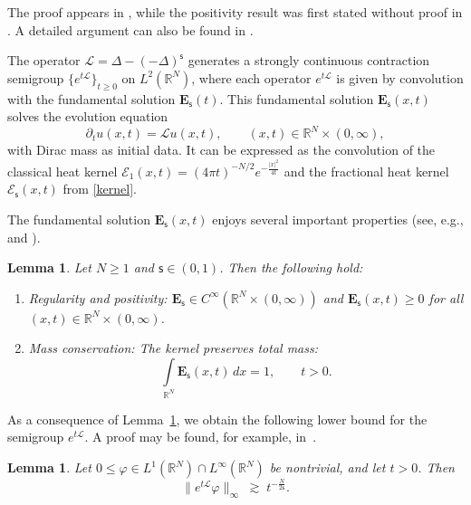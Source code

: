 \documentclass[12pt,reqno]{amsart}
\theoremstyle{plain}
\newtheorem{lem}[thm]{Lemma}
\theoremstyle{definition}
\theoremstyle{remark}
\numberwithin{equation}{section}
\newcommand{\R}{\mathbb R}
\newcommand{\sL}{\mathscr{L}}
\newcommand{\ts}{\mathsf{s}}
\begin{document}
The proof appears in \cite[p.~395]{Alonso2021}, while the positivity result was first stated without proof in \cite[p.~263]{BG1960}. A detailed argument can also be found in \cite[Theorem~2.1]{BG1960}.

The operator $\mathscr{L}=\Delta-(-\Delta)^{\ts}$ generates a strongly continuous contraction semigroup $\{e^{t\mathscr{L}}\}_{t\geq 0}$ on $L^2(\R^N)$, where each operator $e^{t\mathscr{L}}$ is given by convolution with the fundamental solution $\mathbf{E}_{\ts}(t)$. This fundamental solution $\mathbf{E}_{\ts}(x,t)$ solves the evolution equation
\begin{equation}\label{eq-1-1-1}
    \partial_t u(x,t) = \mathscr{L} u(x,t),
    \qquad (x,t)\in \R^N\times (0,\infty),
\end{equation}
with Dirac mass as initial data. It can be expressed as the convolution of the classical heat kernel $\mathscr{E}_{1}(x,t) = (4\pi t)^{-N/2} e^{-\frac{|x|^2}{4t}}$ and the fractional heat kernel $\mathscr{E}_{\ts}(x,t)$ from \eqref{kernel}.  

The fundamental solution $\mathbf{E}_{\ts}(x,t)$ enjoys several important properties (see, e.g., \cite{Kirane2025} and \cite{biagi2024}).

\begin{lem}\label{E-s}
Let $N\ge 1$ and $\ts \in (0,1)$. Then the following hold:
\begin{enumerate}[label=(\roman*)]
    \item \textsf{Regularity and positivity}:  
    $\mathbf{E}_{\ts} \in C^\infty(\R^N \times (0,\infty))$ and $\mathbf{E}_{\ts}(x,t) \geq 0$ for all $(x,t) \in \R^N \times (0,\infty)$.
    
    \item \textsf{Mass conservation}:  
    The kernel preserves total mass:
    \begin{equation}\label{Mass-conv-E}
        \int\limits_{\R^N} \mathbf{E}_{\ts}(x,t)\,dx = 1,
        \qquad t > 0.
    \end{equation}   
\end{enumerate}
\end{lem}

As a consequence of Lemma~\ref{E-s}, we obtain the following lower bound for the semigroup $e^{t\sL}$. A proof may be found, for example, in~\cite{Migu-2025}.

\begin{lem}\label{Bounds-L}
Let $0 \leq \varphi \in L^1(\R^N)\cap L^\infty(\R^N)$ be nontrivial, and let $t>0$. Then
\begin{equation}\label{LB}
\|e^{t\sL}\varphi\|_{\infty} \;\gtrsim\; t^{-\frac{N}{2\ts}}.
\end{equation}
\end{lem}
\end{document}

